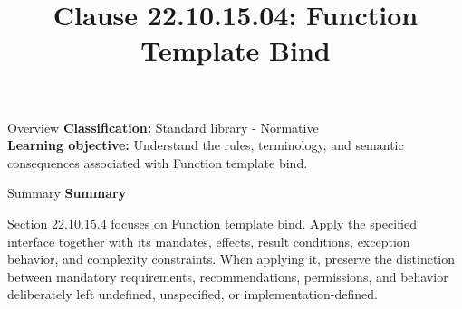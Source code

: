 \documentclass[10pt,letterpaper]{article}
\title{Clause 22.10.15.04: Function Template Bind}
\author{}
\date{}
\begin{document}
\maketitle
\begin{CornellOverviewBox}{Overview}
\textbf{Classification:} Standard library - Normative\\[2pt]
\textbf{Learning objective:} Understand the rules, terminology, and semantic consequences associated with Function template bind.
\end{CornellOverviewBox}\begin{CornellSummaryBox}{Summary}
{\sffamily\bfseries\color{Accent} Summary}\par\vspace{3pt}Section 22.10.15.4 focuses on Function template bind. Apply the specified interface together with its mandates, effects, result conditions, exception behavior, and complexity constraints. When applying it, preserve the distinction between mandatory requirements, recommendations, permissions, and behavior deliberately left undefined, unspecified, or implementation-defined.
\end{CornellSummaryBox}
\end{document}
